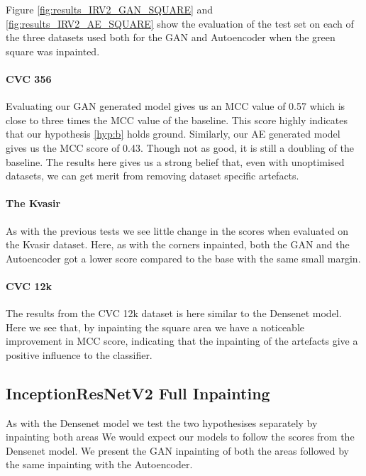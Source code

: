 Figure \ref{fig:results_IRV2_GAN_SQUARE} and \ref{fig:results_IRV2_AE_SQUARE} show the evaluation of the test set on each of the three datasets used both for the GAN and Autoencoder when the green square was inpainted. 
\vspace{7px}

\paragraph{CVC 356}
Evaluating our GAN generated model gives us an MCC value of 0.57 which is close to three times the MCC value of the baseline.  This score highly indicates that our hypothesis \ref{hyp:b} holds ground.
Similarly, our AE generated model gives us the MCC score of 0.43. Though not as good, it is still a doubling of the baseline.
The results here gives us a strong belief that, even with unoptimised datasets, we can get merit from removing dataset specific artefacts.


\paragraph{The Kvasir}
As with the previous tests we see little change in the scores when evaluated on the Kvasir dataset.
Here, as with the corners inpainted, both the GAN and the Autoencoder got a lower score compared to the base with the same small margin. 


\paragraph{CVC 12k}
The results from the CVC 12k dataset is here similar to the Densenet model. Here we see that, by inpainting the square area we have a noticeable improvement in MCC score, indicating that the inpainting of the artefacts give a positive influence to the classifier.













\subsection{InceptionResNetV2 Full Inpainting}
As with the Densenet model we test the two hypothesises separately by inpainting both areas
We would expect our models to follow the scores from the Densenet model.
We present the GAN inpainting of both the areas followed by the same inpainting with the Autoencoder.


